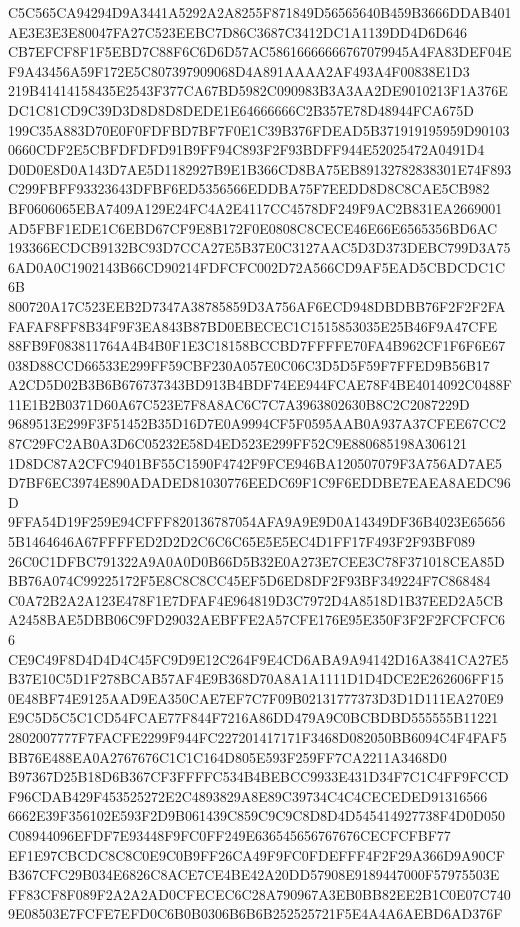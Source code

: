 \documentclass[UTF8,fontset=fandol,zihao=-4,a4paper]{ctexart}
\begin{document}
{{C5C565CA94294D9A3441A5292A2A8255F871849D56565640B459B3666DDAB401AE3E3E3E80047FA27C523EEBC7D86C3687C3412DC1A1139DD4D6D646
CB7EFCF8F1F5EBD7C88F6C6D6D57AC58616666666767079945A4FA83DEF04EF9A43456A59F172E5C807397909068D4A891AAAA2AF493A4F00838E1D3
219B41414158435E2543F377CA67BD5982C090983B3A3AA2DE9010213F1A376EDC1C81CD9C39D3D8D8D8DEDE1E64666666C2B357E78D48944FCA675D
199C35A883D70E0F0FDFBD7BF7F0E1C39B376FDEAD5B371919195959D901030660CDF2E5CBFDFDFD91B9FF94C893F2F93BDFF944E52025472A0491D4
D0D0E8D0A143D7AE5D1182927B9E1B366CD8BA75EB89132782838301E74F893C299FBFF93323643DFBF6ED5356566EDDBA75F7EEDD8D8C8CAE5CB982
BF0606065EBA7409A129E24FC4A2E4117CC4578DF249F9AC2B831EA2669001AD5FBF1EDE1C6EBD67CF9E8B172F0E0808C8CECE46E66E6565356BD6AC
193366ECDCB9132BC93D7CCA27E5B37E0C3127AAC5D3D373DEBC799D3A756AD0A0C1902143B66CD90214FDFCFC002D72A566CD9AF5EAD5CBDCDC1C6B
800720A17C523EEB2D7347A38785859D3A756AF6ECD948DBDBB76F2F2F2FAFAFAF8FF8B34F9F3EA843B87BD0EBECEC1C1515853035E25B46F9A47CFE
88FB9F083811764A4B4B0F1E3C18158BCCBD7FFFFE70FA4B962CF1F6F6E67038D88CCD66533E299FF59CBF230A057E0C06C3D5D5F59F7FFED9B56B17
A2CD5D02B3B6B676737343BD913B4BDF74EE944FCAE78F4BE4014092C0488F11E1B2B0371D60A67C523E7F8A8AC6C7C7A3963802630B8C2C2087229D
9689513E299F3F51452B35D16D7E0A9994CF5F0595AAB0A937A37CFEE67CC287C29FC2AB0A3D6C05232E58D4ED523E299FF52C9E880685198A306121
1D8DC87A2CFC9401BF55C1590F4742F9FCE946BA120507079F3A756AD7AE5D7BF6EC3974E890ADADED81030776EEDC69F1C9F6EDDBE7EAEA8AEDC96D
9FFA54D19F259E94CFFF820136787054AFA9A9E9D0A14349DF36B4023E656565B1464646A67FFFFED2D2D2C6C6C65E5E5EC4D1FF17F493F2F93BF089
26C0C1DFBC791322A9A0A0D0B66D5B32E0A273E7CEE3C78F371018CEA85DBB76A074C99225172F5E8C8C8CC45EF5D6ED8DF2F93BF349224F7C868484
C0A72B2A2A123E478F1E7DFAF4E964819D3C7972D4A8518D1B37EED2A5CBA2458BAE5DBB06C9FD29032AEBFFE2A57CFE176E95E350F3F2F2FCFCFC66
CE9C49F8D4D4D4C45FC9D9E12C264F9E4CD6ABA9A94142D16A3841CA27E5B37E10C5D1F278BCAB57AF4E9B368D70A8A1A1111D1D4DCE2E262606FF15
0E48BF74E9125AAD9EA350CAE7EF7C7F09B02131777373D3D1D111EA270E9E9C5D5C5C1CD54FCAE77F844F7216A86DD479A9C0BCBDBD555555B11221
2802007777F7FACFE2299F944FC227201417171F3468D082050BB6094C4F4FAF5BB76E488EA0A2767676C1C1C164D805E593F259FF7CA2211A3468D0
B97367D25B18D6B367CF3FFFFC534B4BEBCC9933E431D34F7C1C4FF9FCCDF96CDAB429F453525272E2C4893829A8E89C39734C4C4CECEDED91316566
6662E39F356102E593F2D9B061439C859C9C9C8D8D4D545414927738F4D0D050C08944096EFDF7E93448F9FC0FF249E636545656767676CECFCFBF77
EF1E97CBCDC8C8C0E9C0B9FF26CA49F9FC0FDEFFF4F2F29A366D9A90CFB367CFC29B034E6826C8ACE7CE4BE42A20DD57908E9189447000F57975503E
FF83CF8F089F2A2A2AD0CFECEC6C28A790967A3EB0BB82EE2B1C0E07C7409E08503E7FCFE7EFD0C6B0B0306B6B6B252525721F5E4A4A6AEBD6AD376F
}}
\end{document}
